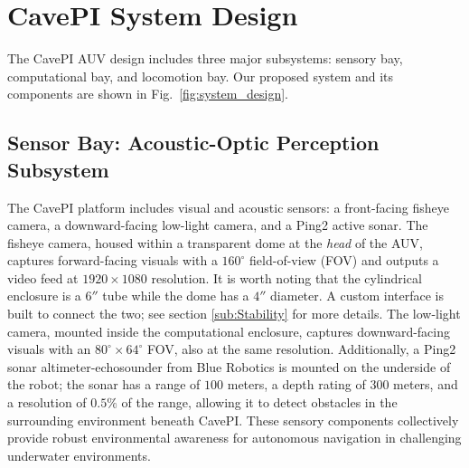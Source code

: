 \section{CavePI System Design}
The CavePI AUV design includes three major subsystems: sensory bay, computational bay, and locomotion bay. Our proposed system and its components are shown in Fig.~\ref{fig:system_design}.  


\subsection{Sensor Bay: Acoustic-Optic Perception Subsystem}
The CavePI platform includes visual and acoustic sensors: a front-facing fisheye camera, a downward-facing low-light camera, and a Ping2 active sonar. The fisheye camera, housed within a transparent dome at the \textit{head} of the AUV, captures forward-facing visuals with a $160^\circ$ field-of-view (FOV) and outputs a video feed at $1920\times1080$ resolution. It is worth noting that the cylindrical enclosure is a $6''$ tube while the dome has a $4''$ diameter. A custom interface is built to connect the two; see section \ref{sub:Stability} for more details. The low-light camera, mounted inside the computational enclosure, captures downward-facing visuals with an $80^\circ \times 64^\circ$ FOV, also at the same resolution. Additionally, a Ping2 sonar altimeter-echosounder from Blue Robotics\texttrademark{} is mounted on the underside of the robot; the sonar has a range of $100$ meters, a depth rating of $300$ meters, and a resolution of $0.5\%$ of the range, allowing it to detect obstacles in the surrounding environment beneath CavePI. These sensory components collectively provide robust environmental awareness for autonomous navigation in challenging underwater environments.




